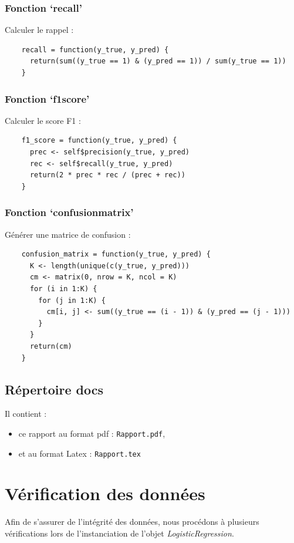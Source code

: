 \documentclass[10pt,french]{report}
\begin{document}
    \subsubsection{Fonction \enquote*{recall}}

    Calculer le rappel :
    \begin{verbatim}
    recall = function(y_true, y_pred) {
      return(sum((y_true == 1) & (y_pred == 1)) / sum(y_true == 1))
    }
    \end{verbatim}

    \subsubsection{Fonction \enquote*{f1\textunderscore score}}

    Calculer le score F1 :
    \begin{verbatim}
    f1_score = function(y_true, y_pred) {
      prec <- self$precision(y_true, y_pred)
      rec <- self$recall(y_true, y_pred)
      return(2 * prec * rec / (prec + rec))
    }
    \end{verbatim}

    \subsubsection{Fonction \enquote*{confusion\textunderscore matrix}}

    Générer une matrice de confusion :
    \begin{verbatim}
    confusion_matrix = function(y_true, y_pred) {
      K <- length(unique(c(y_true, y_pred)))
      cm <- matrix(0, nrow = K, ncol = K)
      for (i in 1:K) {
        for (j in 1:K) {
          cm[i, j] <- sum((y_true == (i - 1)) & (y_pred == (j - 1)))
        }
      }
      return(cm)
    }
    \end{verbatim}
    
	\subsection{Répertoire docs}

	Il contient :
	\begin{itemize}
		\item ce rapport au format pdf : \texttt{Rapport.pdf},
		\item et au format Latex : \texttt{Rapport.tex}
	\end{itemize}

	\section{Vérification des données}
	Afin de s'assurer de l'intégrité des données, nous procédons à plusieurs vérifications lors de l'instanciation de l'objet \textit{LogisticRegression}.
\end{document}
